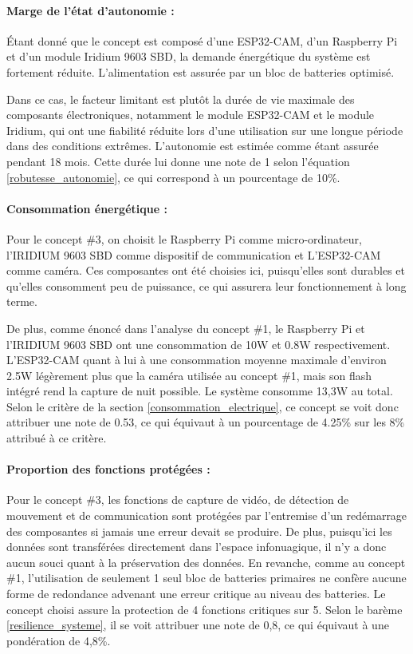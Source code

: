 \paragraph{Marge de l'état d'autonomie :}
Étant donné que le concept est composé d’une ESP32-CAM, d’un Raspberry Pi et d’un module Iridium 9603 SBD, la demande énergétique du système est fortement réduite.
L’alimentation est assurée par un bloc de batteries optimisé.
\bigskip

Dans ce cas, le facteur limitant est plutôt la durée de vie maximale des composants électroniques, notamment le module ESP32-CAM et le module Iridium, qui ont une 
fiabilité réduite lors d’une utilisation sur une longue période dans des conditions extrêmes. L’autonomie est estimée comme étant assurée pendant 18 mois.
Cette durée lui donne une note de 1 selon l’équation \ref{robutesse_autonomie}, ce qui correspond à un pourcentage de 10\%.


\paragraph{Consommation énergétique :}
Pour le concept \#3, on choisit le Raspberry Pi comme micro-ordinateur, l'IRIDIUM 9603 SBD comme dispositif de communication et L'ESP32-CAM comme caméra. 
Ces composantes ont été choisies ici, puisqu'elles sont durables et qu'elles consomment peu de puissance, ce qui assurera leur fonctionnement à long terme.

\bigskip
De plus, comme énoncé dans l'analyse du concept \#1, le Raspberry Pi et l'IRIDIUM 9603 SBD ont une consommation de 10W et 0.8W respectivement. 
L'ESP32-CAM quant à lui à une consommation moyenne maximale d'environ 2.5W légèrement plus que la caméra utilisée au concept \#1, mais son flash intégré 
rend la capture de nuit possible. Le système consomme 13,3W au total.
Selon le critère de la section \ref{consommation_electrique}, ce concept se voit donc attribuer une note de 0.53, ce qui équivaut à un pourcentage de 4.25\% sur les 8\% attribué à ce critère.


\paragraph{Proportion des fonctions protégées :}
Pour le concept \#3, les fonctions de capture de vidéo, de détection de mouvement et de communication sont protégées par l'entremise 
d'un redémarrage des composantes si jamais une erreur devait se produire. De plus, puisqu'ici les données sont transférées directement dans l'espace infonuagique, 
il n'y a donc aucun souci quant à la préservation des données.
En revanche, comme au concept \#1, l'utilisation de seulement 1 seul bloc de batteries primaires ne confère aucune forme de redondance advenant une erreur critique au niveau des batteries.
Le concept choisi assure la protection de 4 fonctions critiques sur 5.
Selon le barème \ref{resilience_systeme}, il se voit attribuer une note de 0,8, ce qui équivaut à une pondération de 4,8\%.


